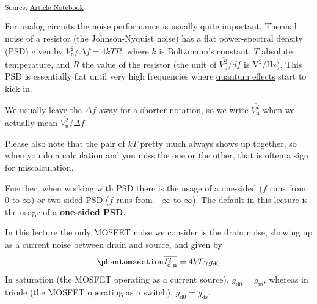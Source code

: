 \documentclass[
  a4paper,
  DIV=11,
  numbers=noendperiod]{scrartcl}
\begin{document}
\textsubscript{Source:
\href{https://iic-jku.github.io/analog-circuit-design/index.qmd.html}{Article
Notebook}}

For analog circuits the noise performance is usually quite important.
Thermal noise of a resistor (the Johnson-Nyquist noise) has a flat
power-spectral density (PSD) given by
\(\overline{V_\mathrm{n}^2}/\Delta f = 4 k T R\), where \(k\) is
Boltzmann's constant, \(T\) absolute temperature, and \(R\) the value of
the resistor (the unit of \(\overline{V_\mathrm{n}^2}/df\) is
\(\text{V}^2/\text{Hz}\)). This PSD is essentially flat until very high
frequencies where
\href{https://en.wikipedia.org/wiki/Johnson–Nyquist_noise}{quantum
effects} start to kick in.

\begin{tcolorbox}[enhanced jigsaw, arc=.35mm, leftrule=.75mm, toprule=.15mm, bottomrule=.15mm, opacityback=0, toptitle=1mm, colbacktitle=quarto-callout-note-color!10!white, colframe=quarto-callout-note-color-frame, left=2mm, titlerule=0mm, bottomtitle=1mm, coltitle=black, title=\textcolor{quarto-callout-note-color}{\faInfo}\hspace{0.5em}{Note}, breakable, rightrule=.15mm, colback=white, opacitybacktitle=0.6]

We usually leave the \(\Delta f\) away for a shorter notation, so we
write \(\overline{V_\mathrm{n}^2}\) when we actually mean
\(\overline{V_\mathrm{n}^2}/\Delta f\).

Please also note that the pair of \(k T\) pretty much always shows up
together, so when you do a calculation and you miss the one or the
other, that is often a sign for miscalculation.

Fuerther, when working with PSD there is the usage of a one-sided (\(f\)
runs from \(0\) to \(\infty\)) or two-sided PSD (\(f\) runs from
\(-\infty\) to \(\infty\)). The default in this lecture is the usage of
a \textbf{one-sided PSD}.

\end{tcolorbox}

In this lecture the only MOSFET noise we consider is the drain noise,
showing up as a current noise between drain and source, and given by
\begin{equation}\phantomsection\label{eq-mosfet-noise}{
\overline{I_\mathrm{d,n}^2} = 4 k T \gamma g_\mathrm{d0}
}\end{equation} In saturation (the MOSFET operating as a current
source), \(g_\mathrm{d0} = g_\mathrm{m}\), whereas in triode (the MOSFET
operating as a switch), \(g_\mathrm{d0} = g_\mathrm{ds}\).
\end{document}
